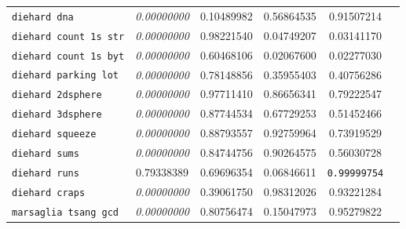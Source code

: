 \documentclass[11pt]{report}
\begin{document}
\begin{appendices}
\begin{center}
\begin{tabular}{lccccc}
    \verb|diehard dna|          & \textit{\textcolor{FAILED}{0.00000000}}   & \textcolor{PASSED}{0.10489982}            & \textcolor{PASSED}{0.56864535}            & \textcolor{PASSED}{0.91507214}            \\
    \verb|diehard count 1s str| & \textit{\textcolor{FAILED}{0.00000000}}   & \textcolor{PASSED}{0.98221540}            & \textcolor{PASSED}{0.04749207}            & \textcolor{PASSED}{0.03141170}            \\
    \verb|diehard count 1s byt| & \textit{\textcolor{FAILED}{0.00000000}}   & \textcolor{PASSED}{0.60468106}            & \textcolor{PASSED}{0.02067600}            & \textcolor{PASSED}{0.02277030}            \\
    \verb|diehard parking lot|  & \textit{\textcolor{FAILED}{0.00000000}}   & \textcolor{PASSED}{0.78148856}            & \textcolor{PASSED}{0.35955403}            & \textcolor{PASSED}{0.40756286}            \\
    \verb|diehard 2dsphere|     & \textit{\textcolor{FAILED}{0.00000000}}   & \textcolor{PASSED}{0.97711410}            & \textcolor{PASSED}{0.86656341}            & \textcolor{PASSED}{0.79222547}            \\
    \verb|diehard 3dsphere|     & \textit{\textcolor{FAILED}{0.00000000}}   & \textcolor{PASSED}{0.87744534}            & \textcolor{PASSED}{0.67729253}            & \textcolor{PASSED}{0.51452466}            \\
    \verb|diehard squeeze|      & \textit{\textcolor{FAILED}{0.00000000}}   & \textcolor{PASSED}{0.88793557}            & \textcolor{PASSED}{0.92759964}            & \textcolor{PASSED}{0.73919529}            \\
    \verb|diehard sums|         & \textit{\textcolor{FAILED}{0.00000000}}   & \textcolor{PASSED}{0.84744756}            & \textcolor{PASSED}{0.90264575}            & \textcolor{PASSED}{0.56030728}            \\
    \verb|diehard runs|         & \textcolor{PASSED}{0.79338389}            & \textcolor{PASSED}{0.69696354}            & \textcolor{PASSED}{0.06846611}            & \texttt{\textcolor{WEAK}{0.99999754}}              \\
    \verb|diehard craps|        & \textit{\textcolor{FAILED}{0.00000000}}   & \textcolor{PASSED}{0.39061750}            & \textcolor{PASSED}{0.98312026}            & \textcolor{PASSED}{0.93221284}            \\
    \verb|marsaglia tsang gcd|  & \textit{\textcolor{FAILED}{0.00000000}}   & \textcolor{PASSED}{0.80756474}            & \textcolor{PASSED}{0.15047973}            & \textcolor{PASSED}{0.95279822}            \\

\end{tabular}
\end{center}
\end{appendices}
\end{document}
